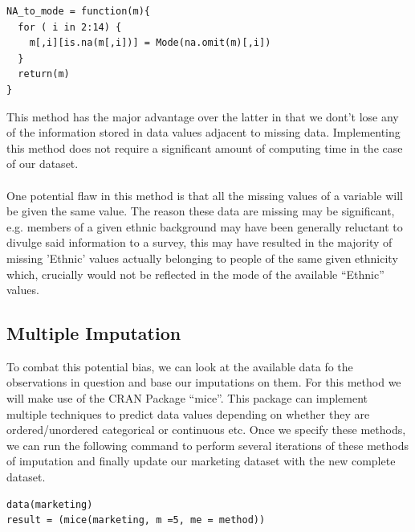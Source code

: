 \documentclass{article}
\begin{document}
\begin{verbatim}
NA_to_mode = function(m){
  for ( i in 2:14) {
    m[,i][is.na(m[,i])] = Mode(na.omit(m)[,i])
  }
  return(m)
}
\end{verbatim}
This method has the major advantage over the latter in that we dont't lose any of the information stored in data values adjacent to missing data. Implementing this method does not require a significant amount of computing time in the case of our dataset.
\\\\
One potential flaw in this method is that all the missing values of a variable will be given the same value. The reason these data are missing may be significant, e.g. members of a given ethnic background may have been generally reluctant to divulge said information to a survey, this may have resulted in the majority of missing 'Ethnic' values actually belonging to people of the same given ethnicity which, crucially would not be reflected in the mode of the available “Ethnic” values.


\subsection{Multiple Imputation}
To combat this potential bias, we can look at the available data fo the observations in question and base our imputations on them. For this method we will make use of the CRAN Package “mice”. This package can implement multiple techniques to predict data values depending on whether they are ordered/unordered categorical or continuous etc. Once we specify these methods, we can run the  following command to perform several iterations of these methods of imputation and finally update our marketing dataset with the new complete dataset.

\begin{verbatim}
data(marketing)
result = (mice(marketing, m =5, me = method))
\end{verbatim}
\end{document}
